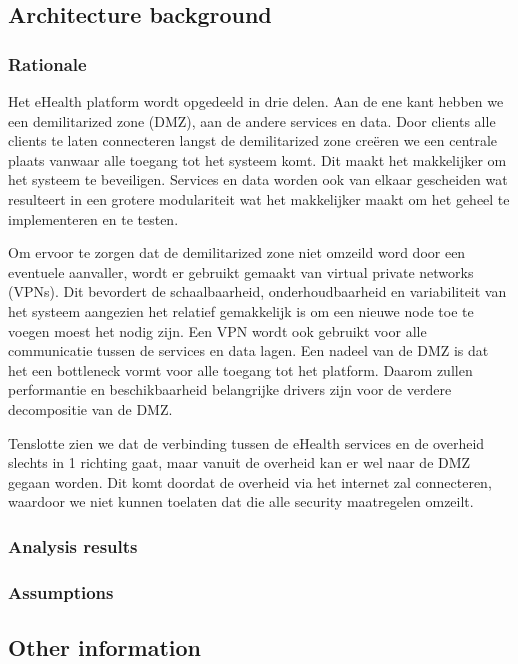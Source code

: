 \documentclass[a4paper,10pt]{book}
\begin{document}
\subsection{Architecture background}

\subsubsection{Rationale}

Het eHealth platform wordt opgedeeld in drie delen. Aan de ene kant hebben we een demilitarized zone (DMZ), aan de andere services en data. Door clients alle clients te laten connecteren langst de demilitarized zone creëren we een centrale plaats vanwaar alle toegang tot het systeem komt. Dit maakt het makkelijker om het systeem te beveiligen. Services en data worden ook van elkaar gescheiden wat resulteert in een grotere modulariteit wat het makkelijker maakt om het geheel te implementeren en te testen.

Om ervoor te zorgen dat de demilitarized zone niet omzeild word door een eventuele aanvaller, wordt er gebruikt gemaakt van virtual private networks (VPNs). Dit bevordert de schaalbaarheid, onderhoudbaarheid en variabiliteit van het systeem aangezien het relatief gemakkelijk is om een nieuwe node toe te voegen moest het nodig zijn. Een VPN wordt ook gebruikt voor alle communicatie tussen de services en data lagen. Een nadeel van de DMZ is dat het een bottleneck vormt voor alle toegang tot het platform. Daarom zullen performantie en beschikbaarheid belangrijke drivers zijn voor de verdere decompositie van de DMZ.

Tenslotte zien we dat de verbinding tussen de eHealth services en de overheid slechts in 1 richting gaat, maar vanuit de overheid kan er wel naar de DMZ gegaan worden. Dit komt doordat de overheid via het internet zal connecteren, waardoor we niet kunnen toelaten dat die alle security maatregelen omzeilt.

\subsubsection{Analysis results}

\subsubsection{Assumptions}

\subsection{Other information}
\end{document}
